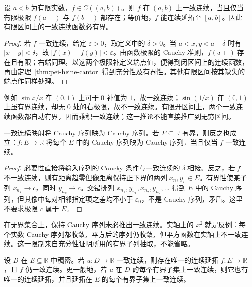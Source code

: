 \begin{theorem}
\label{thm:pei-endpoint-extension}
设 $a<b$ 为有限实数，$f\in C((a,b))$。则 $f$ 在 $(a,b)$ 上一致连续，当且仅当有限极限 $f(a+)$ 与 $f(b-)$ 都存在；等价地，$f$ 能连续延拓至 $[a,b]$。因此有限区间上的一致连续函数必有界。
\end{theorem}

\begin{proof}
若 $f$ 一致连续，给定 $\varepsilon>0$，取定义中的 $\delta>0$。当 $a<x,y<a+\delta$ 时有 $|x-y|<\delta$，故 $|f(x)-f(y)|<\varepsilon$。由函数极限的 Cauchy 准则，$f(a+)$ 存在且有限；右端同理。以这两个极限补定义端点值，便得到闭区间上的连续函数，再由定理~\ref{thm:pei-heine-cantor} 得到充分性及有界性。其他有限区间按其缺失的端点作同样处理。
\end{proof}

例如 $\sin x/x$ 在 $(0,1)$ 上可于 $0$ 补值为 $1$，故一致连续；$\sin(1/x)$ 在 $(0,1)$ 上虽有界连续，却无 $0$ 处的右极限，故不一致连续。有限开区间上，两个一致连续函数都自动有界，因而乘积一致连续；这一推论不能直接推广到无穷区间。

\begin{proposition}
\label{prop:pei-cauchy-preserving}
一致连续映射将 Cauchy 序列映为 Cauchy 序列。若 $E\subseteq\mathbb R$ 有界，则反之也成立：$f:E\to\mathbb R$ 将每个 $E$ 中的 Cauchy 序列映为 Cauchy 序列，当且仅当 $f$ 一致连续。
\end{proposition}

\begin{proof}
必要性直接将输入序列的 Cauchy 条件与一致连续的 $\delta$ 相接。反之，若 $f$ 不一致连续，则有距离趋零但像距离保持正下界的两列 $x_n,y_n\in E$。有界性使某子列 $x_{n_k}\to c$，同时 $y_{n_k}\to c$。交错排列 $x_{n_1},y_{n_1},x_{n_2},y_{n_2},\ldots$ 得到 $E$ 中的 Cauchy 序列，但其像中每对相邻指定项之差均不小于 $\varepsilon_0$，不是 Cauchy 序列，矛盾。这里不要求极限 $c$ 属于 $E$。
\end{proof}

在无界集合上，保持 Cauchy 序列未必推出一致连续。实轴上的 $x^2$ 就是反例：每个实数 Cauchy 序列都收敛，平方后的序列仍收敛，但平方函数在实轴上不一致连续。这一限制来自充分性证明所用的有界子列抽取，不能省略。

\begin{theorem}
\label{thm:pei-dense-extension}
设 $D$ 在 $E\subseteq\mathbb R$ 中稠密。若 $u:D\to\mathbb R$ 一致连续，则存在唯一的连续延拓 $f:E\to\mathbb R$，且 $f$ 仍一致连续。更一般地，若 $u$ 在 $D$ 的每个有界子集上一致连续，则它也有唯一的连续延拓，并且延拓在 $E$ 的每个有界子集上一致连续。
\end{theorem}

